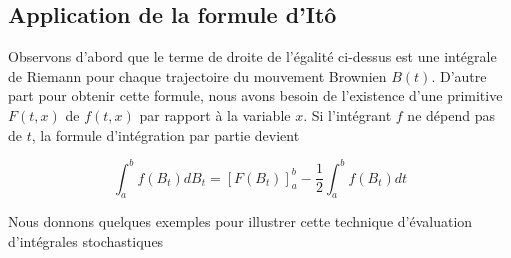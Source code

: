 \documentclass[A4paper,12pt]{report}
\begin{document}
\subsection{Application de la formule d'Itô}
Observons d'abord que le terme de droite de l'égalité ci-dessus est une intégrale de Riemann pour chaque trajectoire du mouvement Brownien $B(t)$. D'autre part pour obtenir cette formule, nous avons besoin de l'existence d'une primitive $F(t, x)$ de $f(t, x)$ par rapport à la variable $x$. Si l'intégrant $f$ ne dépend pas de $t$, la formule d'intégration par partie devient

$$
\int_{a}^{b} f\left(B_{t}\right) d B_{t}=\left[F\left(B_{t}\right)\right]_{a}^{b}-\frac{1}{2} \int_{a}^{b} f\left(B_{t}\right) d t
$$

Nous donnons quelques exemples pour illustrer cette technique d'évaluation d'intégrales stochastiques
\end{document}
